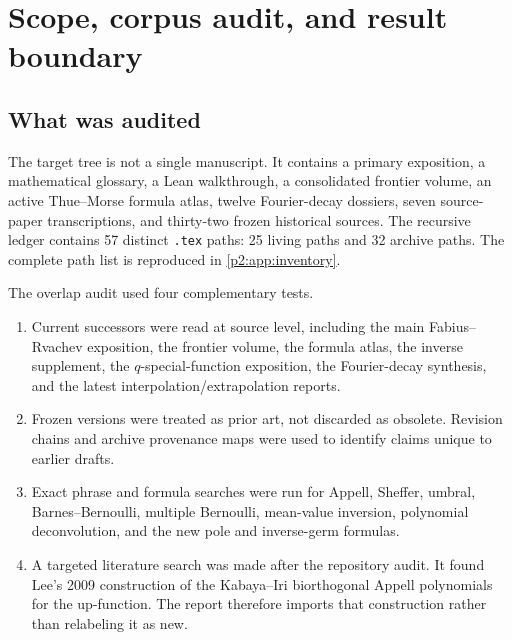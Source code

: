 \documentclass[11pt,oneside]{article}
\numberwithin{equation}{section}
\theoremstyle{definition}
\theoremstyle{remark}
\newcommand{\ii}{\mathrm i}
\begin{document}
\begin{abstract}
Finally, the reciprocal moment generating function is meromorphic with poles at $2\pi\ii n$ of
order $\vtwo(n)+1$.  We transfer the full $2$-adic zero divisor of the infinite sinc product into
large-degree asymptotics of the Appell constants.  The first three pole shells give an explicit
three-term expansion with a polynomial correction from the double pole at $4\pi\ii$.  Stirling
inversion then produces a second, coefficient-theoretic role for the Lambert $W$ function: the first
index at which the Appell constants exceed a prescribed size is
$\log X/(2W(\log X/(2\pi e)))+O(1)$.
\end{abstract}

\begingroup
\footnotesize
\setlength{\parskip}{0pt}

\endgroup
\clearpage

\section{Scope, corpus audit, and result boundary}
\label{p2:sec:scope}

\subsection{What was audited}

The target tree is not a single manuscript.  It contains a primary exposition, a mathematical
glossary, a Lean walkthrough, a consolidated frontier volume, an active Thue--Morse formula atlas,
twelve Fourier-decay dossiers, seven source-paper transcriptions, and thirty-two frozen historical
sources.  The recursive ledger contains 57 distinct \texttt{.tex} paths: 25 living paths and 32 archive
paths.  The complete path list is reproduced in \cref{p2:app:inventory}.

The overlap audit used four complementary tests.
\begin{enumerate}
\item Current successors were read at source level, including the main Fabius--Rvachev exposition,
      the frontier volume, the formula atlas, the inverse supplement, the $q$-special-function
      exposition, the Fourier-decay synthesis, and the latest interpolation/extrapolation reports.
\item Frozen versions were treated as prior art, not discarded as obsolete.  Revision chains and
      archive provenance maps were used to identify claims unique to earlier drafts.
\item Exact phrase and formula searches were run for Appell, Sheffer, umbral, Barnes--Bernoulli,
      multiple Bernoulli, mean-value inversion, polynomial deconvolution, and the new pole and
      inverse-germ formulas.
\item A targeted literature search was made after the repository audit.  It found Lee's 2009
      construction of the Kabaya--Iri biorthogonal Appell polynomials for the up-function.  The
      report therefore imports that construction rather than relabeling it as new.
\end{enumerate}
\end{document}
